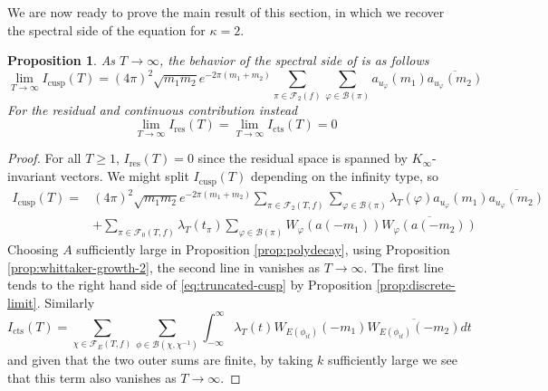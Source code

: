 \documentclass{article}
\newtheorem{proposition}[theorem]{Proposition}
\numberwithin{equation}{section}
\begin{document}
We are now ready to prove the main result of this section, in which we recover the spectral side of the equation for $\kappa=2$.
\begin{proposition}\label{prop:spectral-limit}
    As $T \to \infty$, the behavior of the spectral side of is as follows
    \begin{equation}\label{eq:truncated-cusp}
        \lim_{T \to \infty} I_{\operatorname{cusp}}(T)=(4\pi)^2\sqrt{m_1 m_2}e^{-2\pi(m_1+m_2)} \sum_{\pi \in \mathcal{F}_2(f)}\sum_{\varphi \in \mathcal{B}(\pi)} a_{u_\varphi}(m_1)\overline{a_{u_\varphi}(m_2)}
    \end{equation}
    For the residual and continuous contribution instead
    \begin{equation}
        \lim_{T \to \infty} I_{\operatorname{res}}(T)=\lim_{T \to \infty}I_{\operatorname{cts}}(T)=0
    \end{equation}
\end{proposition}
\begin{proof}
    For all $T\geq 1$, $I_\text{res}(T)=0$ since the residual space is spanned by $K_\infty$-invariant vectors. We might split $I_\text{cusp}(T)$ depending on the infinity type, so
    \begin{equation}
        \begin{split}
        I_\text{cusp}(T)  = &(4\pi)^2\sqrt{m_1m_2}e^{-2\pi(m_1+m_2)}\sum_{\pi \in \mathcal{F}_2(T,f)}\sum_{\varphi \in \mathcal{B}(\pi)}\lambda_{T}(\varphi)a_{u_\varphi}(m_1)\overline{a_{u_\varphi}(m_2)}\\ & + \sum_{\pi \in \mathcal{F}_0(T,f)}\lambda_{T}(t_\pi)\sum_{\varphi \in \mathcal{B}(\pi)}W_{\varphi}(a(-m_1))\overline{W_\varphi(a(-m_2))}
        \end{split}
    \end{equation}
    Choosing $A$ sufficiently large in Proposition \ref{prop:polydecay}, using Proposition \ref{prop:whittaker-growth-2}, the second line in vanishes as $T \to \infty$. The first line tends to the right hand side of \eqref{eq:truncated-cusp} by Proposition \ref{prop:discrete-limit}. Similarly 
    \begin{equation}
        I_\text{cts}(T)=\sum_{\chi \in \mathcal{F}_E(T,f)}\sum_{\phi \in \mathcal{B}(\chi,\chi^{-1})}\int_{-\infty}^{\infty}\lambda_T(t)W_{E(\phi_{it})}(-m_1)\overline{W_{E(\phi_{it})}(-m_2)}dt
    \end{equation}
    and given that the two outer sums are finite, by taking $k$ sufficiently large we see that this term also vanishes as $T \to \infty$.
\end{proof}
\end{document}
